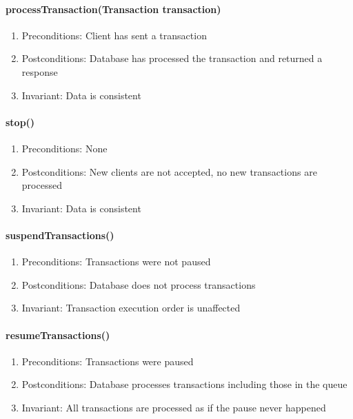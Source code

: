 \documentclass[a4paper]{report}
\begin{document}
	\paragraph{processTransaction(Transaction transaction)}
		\begin{enumerate}
			\item Preconditions: Client has sent a transaction
			\item Postconditions: Database has processed the transaction and returned a response
			\item Invariant: Data is consistent
		\end{enumerate}

		

	\paragraph{stop()}
		\begin{enumerate}
			\item Preconditions: None
			\item Postconditions: New clients are not accepted, no new transactions are processed
			\item Invariant: Data is consistent
		\end{enumerate}

	\paragraph{suspendTransactions()}
		\begin{enumerate}
			\item Preconditions: Transactions were not paused
			\item Postconditions: Database does not process transactions
			\item Invariant: Transaction execution order is unaffected
		\end{enumerate}
	 
	\paragraph{resumeTransactions()}
		\begin{enumerate}
			\item Preconditions: Transactions were paused
			\item Postconditions: Database processes transactions including those in the queue
			\item Invariant: All transactions are processed as if the pause never happened
		\end{enumerate}
\end{document}
